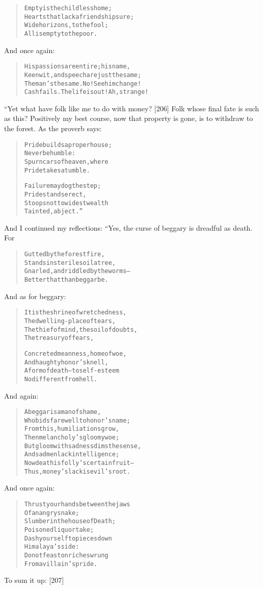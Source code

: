 \documentclass[article, twoside, 14pt]{memoir}
\renewenvironment{verbatim}{%
\begin{quote}%
\vskip -10pt%
\begin{alltt}\normalfont\large}{\end{alltt}%
\end{quote}%
\vskip -10pt
} %
\begin{document}
\begin{verbatim}
Empty is the childless home;
    Hearts that lack a friendship sure;
Wide horizons, to the fool;
    All is empty to the poor.
\end{verbatim}
And once again:

\begin{verbatim}
His passions are entire; his name,
Keen wit, and speech are just the same;
The man's the same. No! See him change!
Cash fails. The life is out! Ah, strange!
\end{verbatim}
“Yet what have folk like me to do with money? [206] Folk whose
final fate is such as this? Positively my best course, now that
property is gone, is to withdraw to the forest. As the proverb
says:

\begin{verbatim}
Pride builds a proper house;
    Never be humble:
Spurn cars of heaven, where
    Pride takes a tumble.

Failure may dog the step;
    Pride stands erect,
Stoops not to widest wealth
    Tainted, abject.”
\end{verbatim}
And I continued my reflections: “Yes, the curse of beggary is
dreadful as death. For

\begin{verbatim}
Gutted by the forest fire,
    Stands in sterile soil a tree,
Gnarled, and riddled by the worms--
    Better that than beggar be.
\end{verbatim}
And as for beggary:

\begin{verbatim}
It is the shrine of wretchedness,
    The dwelling-place of tears,
The thief of mind, the soil of doubts,
    The treasury of fears,

Concreted meanness, home of woe,
    And haughty honor's knell,
A form of death--to self-esteem
    No different from hell.
\end{verbatim}
And again:

\begin{verbatim}
A beggar is a man of shame,
Who bids farewell to honor's name;
From this, humiliations grow,
Then melancholy's gloomy woe;
But gloom with sadness dims the sense,
And sad men lack intelligence;
Now death is folly's certain fruit--
Thus, money's lack is evil's root.
\end{verbatim}
And once again:

\begin{verbatim}
Thrust your hands between the jaws
    Of an angry snake;
Slumber in the house of Death;
    Poisoned liquor take;
Dash yourself to pieces down
    Himalaya's side:
Do not feast on riches wrung
    From a villain's pride.
\end{verbatim}
To sum it up: [207]
\end{document}
